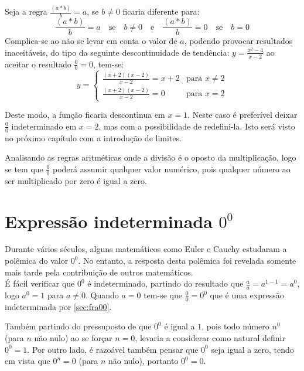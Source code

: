 Seja a regra $\displaystyle \frac{(a*b)}{b} = a$, se $b \neq 0$ ficaria diferente para:
$$
\frac{(a*b)}{b} = a \quad \textrm{se} \quad  b \neq 0 \quad \textrm{e} \quad \frac{(a*b)}{b} = 0 \quad \textrm{se} \quad b = 0
$$
Complica-se ao não se levar em conta o valor de $a$, podendo provocar resultados inaceitáveis, do tipo da seguinte descontinuidade de tendência: $\displaystyle y = \frac{x^2-4}{x-2}$ ao aceitar o resultado $\displaystyle \frac{0}{0} = 0$, tem-se:
\begin{displaymath}
 y = \left\{ 
\begin{array}{ll}
\displaystyle \frac{(x+2)(x-2)}{x-2} = x+2 & \textrm{para $x \neq 2$}\\ 
\displaystyle \frac{(x+2)(x-2)}{x-2} = 0 & \textrm{para $x=2$}
\end{array} \right. 
\end{displaymath}

Deste modo, a função ficaria descontìnua em $x=1$. Neste caso é preferível deixar $\displaystyle \frac{0}{0}$ indeterminado em $x=2$, mas com a possibilidade de redefini-la. Isto será visto no próximo capítulo com a introdução de limites.

Analisando as regras aritméticas onde a divisão é o oposto da multiplicação, logo se tem que $\displaystyle \frac{0}{0}$ poderá assumir qualquer valor numérico, pois qualquer número ao ser multiplicado por zero é igual a zero.

\section{Expressão indeterminada $0^0$}

\quad Durante vários séculos, alguns matemáticos como Euler e Cauchy estudaram a polêmica do valor $0^0$. No entanto, a resposta desta polêmica foi revelada somente mais tarde pela contribuição de outros matemáticos.\\

É fácil verificar que  $0^0$ é indeterminado, partindo do resultado que $\displaystyle \frac{a}{a} = a^{1-1} = a^0$, logo $a^0 = 1$ para $a \neq 0$. Quando $a=0$ tem-se que $\displaystyle \frac{0}{0} = 0^0$ que é uma expressão indeterminada por \ref{sec:fra00}.

Também partindo do pressuposto de que $0^0$ é igual a $1$, pois todo número $n^0$ (para $n$ não nulo) ao se forçar $n=0$, levaria a considerar como natural definir $0^0 = 1$. Por outro lado, é razoável também pensar que $0^0$ seja igual a zero, tendo em vista que $0^n = 0$ (para $n$ não nulo), portanto $0^0 = 0$.\\


